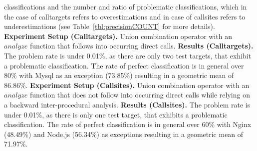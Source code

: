 classifications and the number and ratio of problematic classifications, which in the case of calltargets refers to overestimations and in case of callsites refers to underestimations (see Table~\ref{tbl:precisionCOUNT} for more details).
\textbf{Experiment Setup (Calltargets).} Union combination operator with an $analyze$ function that follows into occurring direct calls.
\textbf{Results (Calltargets).} The problem rate is under 0.01\%, as there are only two test targets, that exhibit a problematic classification. 
The rate of perfect classification is in general over 80\% with Mysql as an exception (73.85\%) resulting in a geometric mean of 86.86\%.
\textbf{Experiment Setup (Callsites).} Union combination operator with an $analyze$ function that does not follow into occurring direct calls while relying on a backward inter-procedural analysis.
\textbf{Results (Callsites).} The problem rate is under 0.01\%, as there is only one test target, that exhibits a problematic classification. The rate of perfect classification is in general over 60\% with Nginx (48.49\%) 
and Node.js (56.34\%) as exceptions resulting in a geometric mean of 71.97\%.



